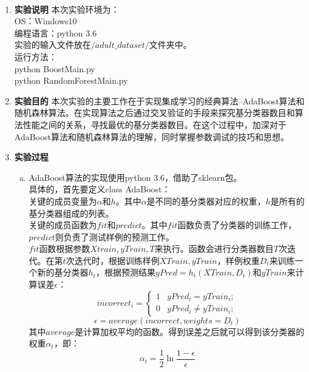 \documentclass[a4paper,UTF8]{article}
\numberwithin{equation}{section}
\begin{document}
\\
\begin{enumerate}[1.]
\item\textbf{实验说明}
本次实验环境为：\\
OS：Windows10\\
编程语言：python 3.6\\
实验的输入文件放在$/adult\_dataset/$文件夹中。\\
运行方法：\\
python BoostMain.py\\
python RandomForestMain.py\\
\item\textbf{实验目的}
本次实验的主要工作在于实现集成学习的经典算法--AdaBoost算法和随机森林算法。在实现算法之后通过交叉验证的手段来探究基分类器数目和算法性能之间的关系，寻找最优的基分类器数目。在这个过程中，加深对于AdaBoost算法和随机森林算法的理解，同时掌握参数调试的技巧和思想。\\
\item\textbf{实验过程}
\begin{enumerate}[a.]
\item AdaBoost算法的实现使用python 3.6，借助了sklearn包。\\
具体的，首先要定义class AdaBoost：\\
关键的成员变量为$\alpha$和$h$。其中$\alpha$是不同的基分类器对应的权重，$h$是所有的基分类器组成的列表。\\
关键的成员函数为$fit$和$predict$。其中$fit$函数负责了分类器的训练工作，$predict$则负责了测试样例的预测工作。\\
$fit$函数根据参数$Xtrain, yTrain, T$来执行。函数会进行分类器数目$T$次迭代。在第$t$次迭代时，根据训练样例$XTrain,yTrain$，样例权重$D_t$来训练一个新的基分类器$h_t$，根据预测结果$yPred = h_t(XTrain, D_t)$和$yTrain$来计算误差$\epsilon$：
\begin{equation}
incorrect_i = 
\begin{cases}
1 & yPred_i = yTrain_i;\\
0 & yPred_i \neq yTrain_i;
\end{cases}
\end{equation}
\begin{equation}
\epsilon = average(incorrect, weights=D_t)
\end{equation}
其中$average$是计算加权平均的函数。得到误差之后就可以得到该分类器的权重$\alpha_t$，即：
\begin{equation}
\alpha_t = \frac{1}{2}\ln \frac{1-\epsilon}{\epsilon}
\end{equation}

\end{enumerate}
\end{enumerate}
\end{document}

